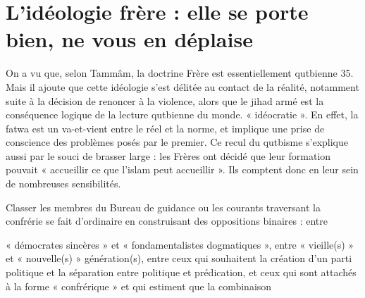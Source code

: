 \hypertarget{liduxe9ologie-fruxe8re-elle-se-porte-bien-ne-vous-en-duxe9plaise}{%
\section{L'idéologie frère : elle se porte bien, ne vous en
déplaise}\label{liduxe9ologie-fruxe8re-elle-se-porte-bien-ne-vous-en-duxe9plaise}}

 
On a vu que, selon Tammâm, la doctrine Frère est essentiellement
qutbienne 35. Mais il ajoute que cette idéologie s'est délitée au
contact de la réalité, notamment suite à la décision de renoncer à la
violence, alors que le jihad armé est la conséquence logique de la
lecture qutbienne du monde.
« idéocratie ». En effet, la fatwa est un va-et-vient entre le réel et
la norme, et implique une prise de conscience des problèmes posés par le
premier.
Ce recul du qutbisme s'explique aussi par le souci de brasser large :
les Frères ont décidé que leur formation pouvait « accueillir ce que
l'islam peut accueillir ». Ils comptent donc en leur sein de nombreuses
sensibilités.

Classer les membres du Bureau de guidance ou les courants traversant la
confrérie se fait d'ordinaire en construisant des oppositions binaires :
entre

« démocrates sincères » et « fondamentalistes dogmatiques », entre «
vieille(s) » et « nouvelle(s) » génération(s), entre ceux qui souhaitent
la création d'un parti politique et la séparation entre politique et
prédication, et ceux qui sont attachés à la forme « confrérique » et qui
estiment que la combinaison


